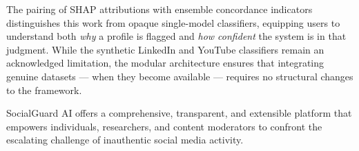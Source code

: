 \documentclass[conference]{IEEEtran}
\begin{document}
The pairing of SHAP attributions with ensemble concordance indicators distinguishes this work from opaque single-model classifiers, equipping users to understand both \textit{why} a profile is flagged and \textit{how confident} the system is in that judgment. While the synthetic LinkedIn and YouTube classifiers remain an acknowledged limitation, the modular architecture ensures that integrating genuine datasets --- when they become available --- requires no structural changes to the framework.

SocialGuard AI offers a comprehensive, transparent, and extensible platform that empowers individuals, researchers, and content moderators to confront the escalating challenge of inauthentic social media activity.

\end{document}
